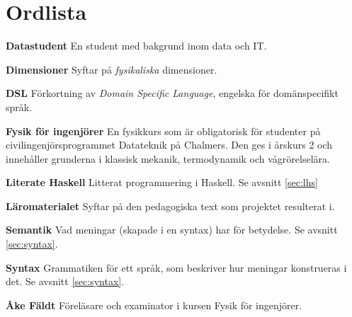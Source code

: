 
\chapter*{Ordlista}

\textbf{Datastudent} En student med bakgrund inom data och IT.

\textbf{Dimensioner} Syftar på \textit{fysikaliska} dimensioner.

\textbf{DSL} Förkortning av \textit{Domain Specific Language}, engelska för domänspecifikt språk.

\textbf{Fysik för ingenjörer} En fysikkurs som är obligatorisk för studenter på civilingenjörsprogrammet Datateknik på Chalmers. Den ges i årskurs 2 och innehåller grunderna i klassisk mekanik, termodynamik och vågrörelselära.

\textbf{Literate Haskell} Litterat programmering i Haskell. Se avsnitt \ref{sec:lhs}

\textbf{Läromaterialet} Syftar på den pedagogiska text som projektet resulterat i.

\textbf{Semantik} Vad meningar (skapade i en syntax) har för betydelse. Se avsnitt \ref{sec:syntax}.

\textbf{Syntax} Grammatiken för ett språk, som beskriver hur meningar konstrueras i det. Se avsnitt \ref{sec:syntax}.

\textbf{Åke Fäldt} Föreläsare och examinator i kursen Fysik för ingenjörer.
